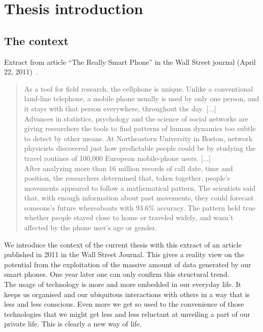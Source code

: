\chapter{Thesis introduction}

\section{The context}

Extract from article ``The Really Smart Phone'' in the Wall Street journal (April 22, 2011)~\cite{really-smart-phone}.

\begin{quotation}
  As a tool for field research, the cellphone is unique. Unlike a
  conventional land-line telephone, a mobile phone usually is used by
  only one person, and it stays with that person everywhere,
  throughout the day.
  [...]\\

  Advances in statistics, psychology and the
  science of social networks are giving researchers the tools to find
  patterns of human dynamics too subtle to detect by other means. At
  Northeastern University in Boston, network physicists discovered
  just how predictable people could be by studying the travel routines
  of 100,000 European mobile-phone users.
  [...]\\

  After analyzing more than
  16 million records of call date, time and position, the researchers
  determined that, taken together, people's movements appeared to
  follow a mathematical pattern. The scientists said that, with enough
  information about past movements, they could forecast someone's
  future whereabouts with 93.6\% accuracy.
  The pattern held true whether people stayed close to home or
  traveled widely, and wasn't affected by the phone user's age or
  gender.\\
\end{quotation}


We introduce the context of the current thesis with this extract of an article published in 2011 in the Wall Street Journal.
This gives a reality view on the potential from the exploitation of the massive amount of data generated by our smart phones.
One year later one can only confirm this structural trend.\\

The usage of technology is more and more embedded in our everyday life.
It keeps us organised and our ubiquitous interactions with others in a way that is less and less conscious.
Even more we get so used to the convenience of those technologies that we might get less and less reluctant at unveiling a part of our private life.
This is clearly a new way of life.\\

